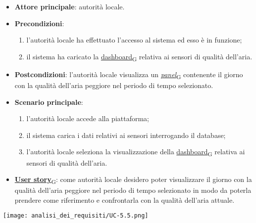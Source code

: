 \begin{itemize}
	\item \textbf{Attore principale}: autorità locale.
	\item \textbf{Precondizioni}:
	      \begin{enumerate}
		      \item l'autorità locale ha effettuato l'accesso al sistema ed esso è in funzione;
		      \item il sistema ha caricato la \href{https://7last.github.io/docs/rtb/documentazione-interna/glossario\#dashboard}{dashboard\textsubscript{G}} relativa ai sensori di qualità dell'aria.
	      \end{enumerate}
	\item \textbf{Postcondizioni}: l'autorità locale visualizza un \href{https://7last.github.io/docs/rtb/documentazione-interna/glossario\#panel}{\textit{panel}\textsubscript{G}} contenente il giorno con la qualità dell'aria peggiore nel periodo di tempo selezionato.
	\item \textbf{Scenario principale}:
	      \begin{enumerate}
		      \item l'autorità locale accede alla piattaforma;
		      \item il sistema carica i dati relativi ai sensori interrogando il database;
		      \item l'autorità locale seleziona la visualizzazione della \href{https://7last.github.io/docs/rtb/documentazione-interna/glossario\#dashboard}{dashboard\textsubscript{G}} relativa ai sensori di qualità dell'aria.
	      \end{enumerate}
	\item \href{https://7last.github.io/docs/rtb/documentazione-interna/glossario\#user-story}{\textbf{User story}\textsubscript{G}}:
	      come autorità locale desidero poter visualizzare il giorno con la qualità dell'aria peggiore nel periodo di tempo selezionato
	      in modo da poterla prendere come riferimento e confrontarla con la qualità dell'aria attuale.
\end{itemize}
\begin{center}
	\texttt{[image: analisi\_dei\_requisiti/UC-5.5.png]}
\end{center}

